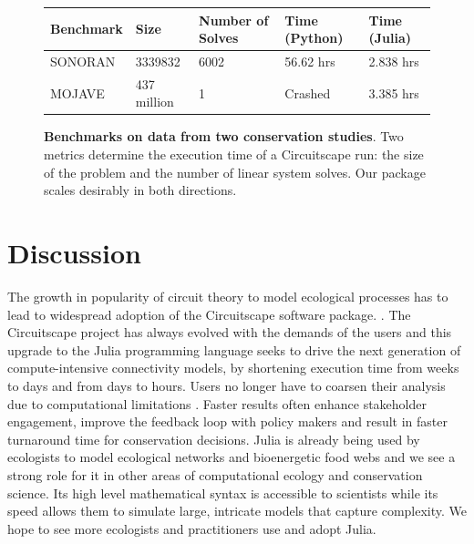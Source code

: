 \documentclass{juliacon}
\begin{document}
\begin{figure}
\begin{tabular}{|l|l|l|l|l|}
\hline
\textbf{Benchmark} & \textbf{Size} & \textbf{Number of Solves} & \textbf{Time (Python)} & \textbf{Time (Julia)} \\ \hline
SONORAN            & 3339832       & 6002                      & 56.62 hrs              & 2.838 hrs             \\ \hline
MOJAVE             & 437 million   & 1                         & Crashed                & 3.385 hrs             \\ \hline
\end{tabular}
\centering
\caption{\textbf{Benchmarks on data from two conservation studies}. Two metrics determine the execution time of a Circuitscape run: the size of the problem and the number of linear system solves. Our package scales desirably in both directions. }
\label{table:bench}
\end{figure}

\section{Discussion}

The growth in popularity of circuit theory to model ecological processes has to lead to widespread adoption of the Circuitscape software package. \cite{mcrae_shah_mohapatra_anantharaman}. The Circuitscape project has always evolved with the demands of the users and this upgrade to the Julia programming language seeks to drive the next generation of compute-intensive connectivity models, by shortening execution time from weeks to days and from days to hours. Users no longer have to coarsen their analysis due to computational limitations \cite{drake2017using}. Faster results often enhance stakeholder engagement, improve the feedback loop with policy makers and result in faster turnaround time for conservation decisions. Julia is already being used by ecologists to model ecological networks \cite{timothee_poisot_2018_1438428} and bioenergetic food webs \cite{delmas_eva_2019_2584373} and we see a strong role for it in other areas of computational ecology and conservation science. Its high level mathematical syntax is accessible to scientists while its speed allows them to simulate large, intricate models that capture complexity. We hope to see more ecologists and practitioners use and adopt Julia. 
\end{document}
